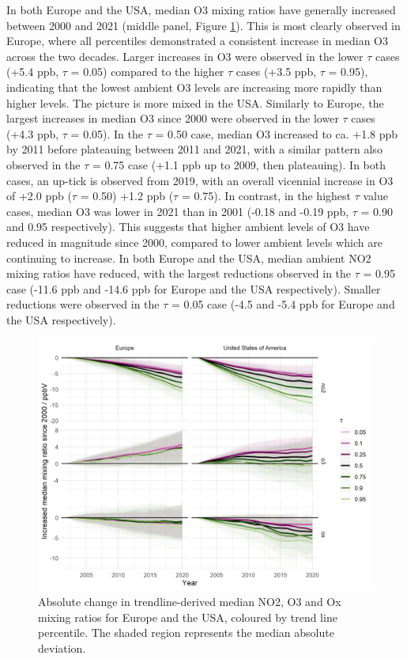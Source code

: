 \documentclass[journal abbreviation, manuscript]{copernicus}
\begin{document}
In both Europe and the USA, median O3 mixing ratios have generally increased between 2000 and 2021 (middle panel, Figure \ref{median_slopes_per_tau_cont_name_absolute}). This is most clearly observed in Europe, where all percentiles demonstrated a consistent increase in median O3 across the two decades. Larger increases in O3 were observed in the lower $\tau$ cases (+5.4 ppb, $\tau$ = 0.05) compared to the higher $\tau$ cases (+3.5 ppb, $\tau$ = 0.95), indicating that the lowest ambient O3 levels are increasing more rapidly than higher levels. The picture is more mixed in the USA. Similarly to Europe, the largest increases in median O3 since 2000 were observed in the lower $\tau$ cases (+4.3 ppb, $\tau$ = 0.05). In the $\tau$ = 0.50 case, median O3 increased to ca. +1.8 ppb by 2011 before plateauing between 2011 and 2021, with a similar pattern also observed in the $\tau$ = 0.75 case (+1.1 ppb up to 2009, then plateauing). In both cases, an up-tick is observed from 2019, with an overall vicennial increase in O3 of +2.0 ppb ($\tau$ = 0.50) +1.2 ppb ($\tau$ = 0.75). In contrast, in the highest $\tau$ value cases, median O3 was lower in 2021 than in 2001 (-0.18 and -0.19 ppb, $\tau$ = 0.90 and 0.95 respectively). This suggests that higher ambient levels of O3 have reduced in magnitude since 2000, compared to lower ambient levels which are continuing to increase. In both Europe and the USA, median ambient NO2 mixing ratios have reduced, with the largest reductions observed in the $\tau$ = 0.95 case (-11.6 ppb and -14.6 ppb for Europe and the USA respectively). Smaller reductions were observed in the $\tau$ = 0.05 case (-4.5 and -5.4 ppb for Europe and the USA respectively).

\begin{figure}[h!]
\includegraphics[width=12cm]{plots/fixed_median_slopes_per_tau_continent_name_absolute_change_with_mad_ribbon.png}
\caption{Absolute change in trendline-derived median NO2, O3 and Ox mixing ratios for Europe and the USA, coloured by trend line percentile. The shaded region represents the median absolute deviation.}
\label{median_slopes_per_tau_cont_name_absolute}
\end{figure}
\end{document}
